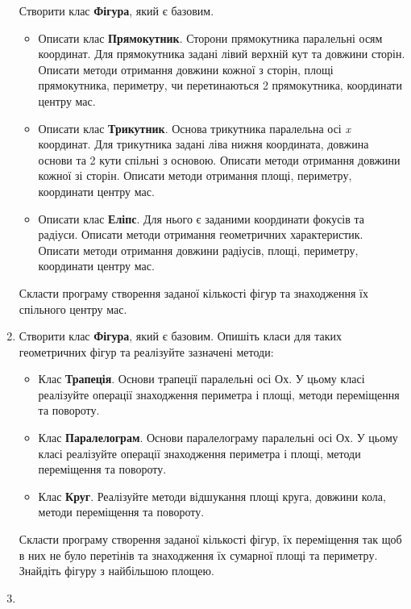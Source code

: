 \documentclass[a5paper,titlepage,openany,twoside,draft]{book_unv}%
\begin{document}
\begin{enumerate}
Створити клас \textbf{Фігура}, який є базовим.
\begin{itemize}
\item
Описати клас \textbf{Прямокутник}. Сторони прямокутника паралельні осям
координат. Для прямокутника задані лівий верхній кут та довжини сторін.
Описати методи отримання довжини кожної з сторін, площі прямокутника,
периметру, чи перетинаються 2 прямокутника, координати центру мас. 
\item
Описати клас \textbf{Трикутник}. Основа трикутника паралельна осі
\emph{x} координат. Для трикутника задані ліва нижня координата,
довжина основи та 2 кути спільні з основою. Описати методи отримання довжини кожної зі сторін.
Описати методи отримання площі, периметру, координати центру мас.  
\item
Описати клас \textbf{Еліпс}. Для нього є заданими координати фокусів та радіуси.
Описати методи отримання геометричних характеристик. Описати методи
отримання довжини радіусів, площі, периметру, координати центру мас. 
\end{itemize}

Скласти програму створення заданої кількості фігур та знаходження їх спільного центру мас.


\item
Створити клас \textbf{Фігура}, який є базовим.  Опишіть класи для 
таких геометричних фігур та реалізуйте зазначені методи:
\begin{itemize}
\item
  Клас \textbf{Трапеція}. Основи трапеції паралельні осі Ох. У цьому класі реалізуйте операції 
знаходження периметра і площі, методи переміщення та повороту.
\item
  Клас \textbf{Паралелограм}. Основи паралелограму паралельні осі Ох. 
У цьому класі реалізуйте операції знаходження периметра і площі, 
методи переміщення та повороту.
\item
  Клас \textbf{Круг}. Реалізуйте методи відшукання площі круга, довжини кола,
  методи переміщення та повороту.
\end{itemize}
Скласти програму створення заданої кількості фігур, їх переміщення так щоб в них не було
перетінів та знаходження їх сумарної площі та периметру. 
Знайдіть фігуру з найбільшою площею.


\item


\end{enumerate}
\end{document}
